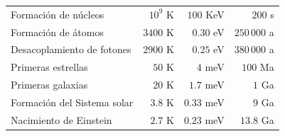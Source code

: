 {\begin{table}[t]
\begin{tabular}{lrrr}
                \rowcolor{migris!50}
                {\color[HTML]{FFFFFF} Formación de núcleos}       & {\color[HTML]{FFFFFF} \(10^{9}\) K}                               & {\color[HTML]{FFFFFF} \(100\) KeV}                                & {\color[HTML]{FFFFFF} \(200\) s}                                  \\
                Formación de átomos                               & \(3400\) K                                                        & \(0.30\) eV                                                       & \(250\,000\) a                                                    \\
                \rowcolor{migris!50}
                {\color[HTML]{FFFFFF} Desacoplamiento de fotones} & {\color[HTML]{FFFFFF} \(2900\) K}                                 & {\color[HTML]{FFFFFF} \(0.25\) eV}                                & {\color[HTML]{FFFFFF} \(380\,000\) a}                             \\
                Primeras estrellas                                & \(50\) K                                                          & \(4\) meV                                                         & \(100\) Ma                                                        \\
                \rowcolor{migris!50}
                {\color[HTML]{FFFFFF} Primeras galaxias}          & {\color[HTML]{FFFFFF} \(20\) K}                                   & {\color[HTML]{FFFFFF} \(1.7\) meV}                                & {\color[HTML]{FFFFFF} \(1\) Ga}                                   \\
                Formación del Sistema solar                                     & \(3.8\) K                                                         & \(0.33\) meV                                                      & \(9\) Ga                                                          \\
                \rowcolor{migris!50}
                {\color[HTML]{FFFFFF} Nacimiento de Einstein}     & {\color[HTML]{FFFFFF} \(2.7\) K}                                  & {\color[HTML]{FFFFFF} \(0.23\) meV}                               & {\color[HTML]{FFFFFF} \(13.8\) Ga}                                \\ \bottomrule
            \end{tabular}
        \end{table}}

